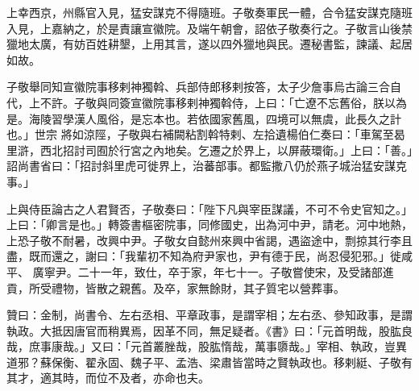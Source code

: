 \begin{pinyinscope}
 上幸西京，州縣官入見，猛安謀克不得隨班。子敬奏軍民一體，合令猛安謀克隨班入見，上嘉納之，於是責讓宣徽院。及端午朝會，詔依子敬奏行之。子敬言山後禁獵地太廣，有妨百姓耕墾，上用其言，遂以四外獵地與民。遷秘書監，諫議、起居如故。



 子敬舉同知宣徽院事移剌神獨斡、兵部侍郎移剌按答，太子少詹事烏古論三合自代，上不許。子敬與同簽宣徽院事移剌神獨斡侍，上曰：「亡遼不忘舊俗，朕以為是。海陵習學漢人風俗，是忘本也。若依國家舊風，四境可以無虞，此長久之計也。」世宗
 將如涼陘，子敬與右補闕粘割斡特剌、左拾遺楊伯仁奏曰：「車駕至曷里滸，西北招討司囿於行宮之內地矣。乞遷之於界上，以屏蔽環衛。」上曰：「善。」詔尚書省曰：「招討斜里虎可徙界上，治蕃部事。都監撒八仍於燕子城治猛安謀克事。」



 上與侍臣論古之人君賢否，子敬奏曰：「陛下凡與宰臣謀議，不可不令史官知之。」上曰：「卿言是也。」轉簽書樞密院事，同修國史，出為河中尹，請老。河中地熱，上恐子敬不耐暑，改興中尹。子敬女自懿州來興中省謁，遇盜途中，剽掠其行李且盡，既而還之，謝曰：「我輩初不知為府尹家也，尹有德于民，尚忍侵犯邪。」徙咸平、
 廣寧尹。二十一年，致仕，卒于家，年七十一。子敬嘗使宋，及受諸部進貢，所受禮物，皆散之親舊。及卒，家無餘財，其子質宅以營葬事。



 贊曰：金制，尚書令、左右丞相、平章政事，是謂宰相；左右丞、參知政事，是謂執政。大抵因唐官而稍異焉，因革不同，無足疑者。《書》曰：「元首明哉，股肱良哉，庶事康哉。」又曰：「元首叢脞哉，股肱惰哉，萬事隳哉。」宰相、執政，豈異道邪？蘇保衡、翟永固、魏子平、孟浩、梁肅皆當時之賢執政也。移剌綎、子敬有其才，適其時，而位不及者，亦命也夫。



\end{pinyinscope}